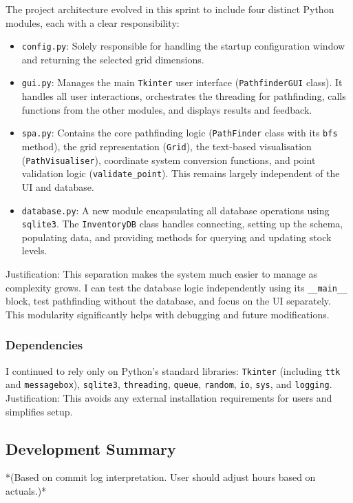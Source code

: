 The project architecture evolved in this sprint to include four distinct Python modules, each with a clear responsibility:
\begin{itemize}
	\item \verb|config.py|: Solely responsible for handling the startup configuration window and returning the selected grid dimensions.
	\item \verb|gui.py|: Manages the main \verb|Tkinter| user interface (\verb|PathfinderGUI| class). It handles all user interactions, orchestrates the threading for pathfinding, calls functions from the other modules, and displays results and feedback.
	\item \verb|spa.py|: Contains the core pathfinding logic (\verb|PathFinder| class with its \verb|bfs| method), the grid representation (\verb|Grid|), the text-based visualisation (\verb|PathVisualiser|), coordinate system conversion functions, and point validation logic (\verb|validate_point|). This remains largely independent of the UI and database.
	\item \verb|database.py|: A new module encapsulating all database operations using \verb|sqlite3|. The \verb|InventoryDB| class handles connecting, setting up the schema, populating data, and providing methods for querying and updating stock levels.
\end{itemize}
Justification: This separation makes the system much easier to manage as complexity grows. I can test the database logic independently using its \verb|__main__| block, test pathfinding without the database, and focus on the UI separately. This modularity significantly helps with debugging and future modifications.

\subsubsection{Dependencies}
I continued to rely only on Python's standard libraries: \verb|Tkinter| (including \verb|ttk| and \verb|messagebox|), \verb|sqlite3|, \verb|threading|, \verb|queue|, \verb|random|, \verb|io|, \verb|sys|, and \verb|logging|. Justification: This avoids any external installation requirements for users and simplifies setup.

\newpage
\subsection{Development Summary}

*(Based on commit log interpretation. User should adjust hours based on actuals.)*

